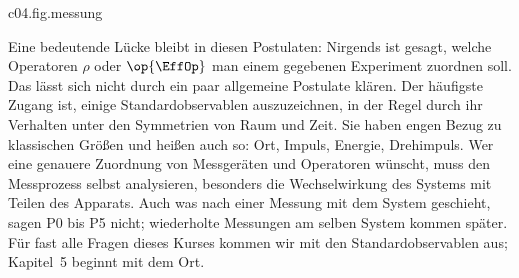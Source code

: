 \begin{tpcfigure}{c04.fig.messung}
  \caption{Was die Postulate P2, P4 und P5 zusammen festlegen, für ein Qubit mit
    $\op{\Ham} = \varepsilon\,\pauli{x}$ und die Z-Messung $\op{\EffOp} = \ketbra{0}{0}$. (a) Die
    Zustände~\eqref{c04.eq.qubit} mit $\real x = 0$: Positivität, Gleichung~\eqref{c04.eq.det},
    schneidet eine Scheibe vom Radius $\tfrac12$ um $\Id/2$ aus; außerhalb (schraffiert) liegen
    hermitesche Matrizen mit Spur eins, die keine Zustände sind. Der Rand sind die reinen Zustände.
    $\op{U}_t$ dreht die Scheibe um ihren Mittelpunkt, Gleichung~\eqref{c04.eq.kreis}; die Kreise sind
    die Bahnen des reinen Zustands $\ketbra{0}{0}$ (durchgezogen) und eines gemischten Zustands
    $\rho$ mit $r = \tfrac{3}{10}$ (gepunktet). (b) Die Ansprechwahrscheinlichkeit
    $\tr(\rho_t\op{\EffOp}) = p_t$ über der Zeit, in Einheiten von $\hbar/\varepsilon$: Der Abstand $r$
    vom Mittelpunkt in (a) ist die Amplitude in (b). Der reine Zustand schwingt zwischen $0$ und
    $1$, Gleichung~\eqref{c04.eq.rabi}; der maximal gemischte Zustand $\Id/2$ antwortet immer mit
    $\tfrac12$ (waagerechte Linie).}
\end{tpcfigure}

Eine bedeutende Lücke bleibt in diesen Postulaten: Nirgends ist gesagt, welche Operatoren $\rho$
oder $\op{\EffOp}$ man einem gegebenen Experiment zuordnen soll. Das lässt sich nicht durch ein paar
allgemeine Postulate klären. Der häufigste Zugang ist, einige Standardobservablen auszuzeichnen, in
der Regel durch ihr Verhalten unter den Symmetrien von Raum und Zeit. Sie haben engen Bezug zu
klassischen Größen und heißen auch so: Ort, Impuls, Energie, Drehimpuls. Wer eine genauere
Zuordnung von Messgeräten und Operatoren wünscht, muss den Messprozess selbst analysieren, besonders
die Wechselwirkung des Systems mit Teilen des Apparats. Auch was nach einer Messung mit dem System
geschieht, sagen P0 bis P5 nicht; wiederholte Messungen am selben System kommen später. Für fast alle Fragen dieses Kurses kommen
wir mit den Standardobservablen aus; Kapitel~5 beginnt mit dem Ort.
